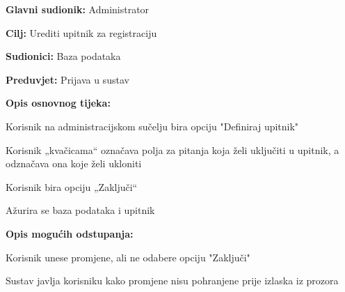 					\noindent {}
					\begin{packed_item}
						\item \textbf{Glavni sudionik:} Administrator
						\item \textbf{Cilj:} Urediti upitnik za registraciju
						\item \textbf{Sudionici:} Baza podataka
						\item \textbf{Preduvjet:} Prijava u sustav
						
						\item \textbf{Opis osnovnog tijeka:} 
						\item[] \begin{packed_enum}
							\item Korisnik na administracijskom sučelju bira opciju "Definiraj upitnik"
							\item Korisnik „kvačicama“ označava polja za pitanja koja želi uključiti u upitnik, a odznačava ona koje želi ukloniti
							\item Korisnik bira opciju „Zaključi“
							\item Ažurira se baza podataka i upitnik
						\end{packed_enum}
					
						\item \textbf{Opis mogućih odstupanja:}
						\item[] \begin{packed_enum}

							\item[2.a] Korisnik unese promjene, ali ne odabere opciju "Zaključi"
							\item[] \begin{packed_enum}
								\item[1.] Sustav javlja korisniku kako promjene nisu pohranjene prije izlaska iz prozora
							\end{packed_enum}
							
						\end{packed_enum}
					\end{packed_item}


